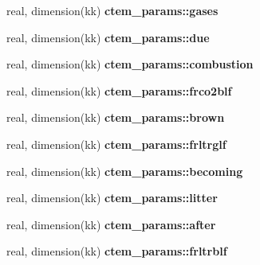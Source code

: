 \begin{DoxyCompactItemize}
\item 
\hypertarget{namespacectem__params_ae396d4a75f22fa8b986ced34e725ff8e}{}real, dimension(kk) {\bfseries ctem\+\_\+params\+::gases}\label{namespacectem__params_ae396d4a75f22fa8b986ced34e725ff8e}

\item 
\hypertarget{namespacectem__params_aa0cf93ccec017e1c5fdb27eee4fd23b3}{}real, dimension(kk) {\bfseries ctem\+\_\+params\+::due}\label{namespacectem__params_aa0cf93ccec017e1c5fdb27eee4fd23b3}

\item 
\hypertarget{namespacectem__params_a409878d5645653cc1a638e8f8916f6f1}{}real, dimension(kk) {\bfseries ctem\+\_\+params\+::combustion}\label{namespacectem__params_a409878d5645653cc1a638e8f8916f6f1}

\item 
\hypertarget{namespacectem__params_a9a3a13ca8c1ce9a4b4eafa3ce20308f1}{}real, dimension(kk) {\bfseries ctem\+\_\+params\+::frco2blf}\label{namespacectem__params_a9a3a13ca8c1ce9a4b4eafa3ce20308f1}

\item 
\hypertarget{namespacectem__params_a0795777d16b6d3a4b98be8d48ed0a635}{}real, dimension(kk) {\bfseries ctem\+\_\+params\+::brown}\label{namespacectem__params_a0795777d16b6d3a4b98be8d48ed0a635}

\item 
\hypertarget{namespacectem__params_ab9c6dc0514620728eecf50eb9c37892e}{}real, dimension(kk) {\bfseries ctem\+\_\+params\+::frltrglf}\label{namespacectem__params_ab9c6dc0514620728eecf50eb9c37892e}

\item 
\hypertarget{namespacectem__params_afafb20053493629fb7f9a8cb9f59343f}{}real, dimension(kk) {\bfseries ctem\+\_\+params\+::becoming}\label{namespacectem__params_afafb20053493629fb7f9a8cb9f59343f}

\item 
\hypertarget{namespacectem__params_a05cb469e247e17b203d81e41d6c84ea4}{}real, dimension(kk) {\bfseries ctem\+\_\+params\+::litter}\label{namespacectem__params_a05cb469e247e17b203d81e41d6c84ea4}

\item 
\hypertarget{namespacectem__params_a09ee6530645f8dd8eebfee95bec4e930}{}real, dimension(kk) {\bfseries ctem\+\_\+params\+::after}\label{namespacectem__params_a09ee6530645f8dd8eebfee95bec4e930}

\item 
\hypertarget{namespacectem__params_a665ceea7e9350e769153df8ce09859c9}{}real, dimension(kk) {\bfseries ctem\+\_\+params\+::frltrblf}\label{namespacectem__params_a665ceea7e9350e769153df8ce09859c9}


\end{DoxyCompactItemize}
